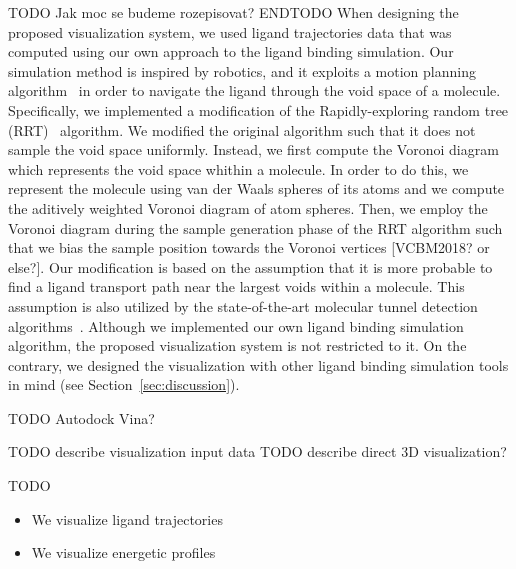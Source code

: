 \documentclass{vgtc}                          %
\begin{document}
TODO Jak moc se budeme rozepisovat? ENDTODO
When designing the proposed visualization system, we used ligand trajectories data that was computed using our own approach to the ligand binding simulation.
Our simulation method is inspired by robotics, and it exploits a motion planning algorithm~\cite{lavalle2006planning} in order to navigate the ligand through the void space of a molecule.
Specifically, we implemented a modification of the Rapidly-exploring random tree (RRT)~\cite{lavalle1998rapidly} algorithm.
We modified the original algorithm such that it does not sample the void space uniformly.
Instead, we first compute the Voronoi diagram which represents the void space whithin a molecule.
In order to do this, we represent the molecule using van der Waals spheres of its atoms and we compute the aditively weighted Voronoi diagram of atom spheres.
Then, we employ the Voronoi diagram during the sample generation phase of the RRT algorithm such that we bias the sample position towards the Voronoi vertices [VCBM2018? or else?].
Our modification is based on the assumption that it is more probable to find a ligand transport path near the largest voids within a molecule.
This assumption is also utilized by the state-of-the-art molecular tunnel detection algorithms~\cite{yaffe2008molaxis, chovancova2012caver, sehnal2013mole}.
Although we implemented our own ligand binding simulation algorithm, the proposed visualization system is not restricted to it.
On the contrary, we designed the visualization with other ligand binding simulation tools in mind (see Section~\ref{sec:discussion}).

TODO Autodock Vina?

TODO describe visualization input data
TODO describe direct 3D visualization?

TODO
\begin{itemize}
  \item We visualize ligand trajectories
  \item We visualize energetic profiles
\end{itemize}
\end{document}
